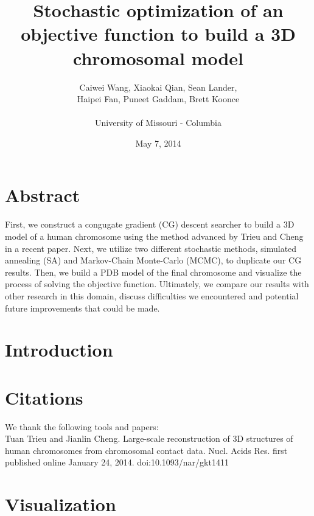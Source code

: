 \documentclass{article}
\title{Stochastic optimization of an objective function to build a 3D chromosomal model}
\author{Caiwei Wang, Xiaokai Qian, Sean Lander, \\Haipei Fan, Puneet Gaddam, Brett Koonce\\\\University of Missouri - Columbia}
\date{May 7, 2014}
\begin{document}
\maketitle

\section{Abstract}

First, we construct a congugate gradient (CG) descent searcher to build a 3D model of a human chromosome using the method advanced by Trieu and Cheng in a recent paper.  Next, we utilize two different stochastic methods, simulated annealing (SA) and Markov-Chain Monte-Carlo (MCMC), to duplicate our CG results.  Then, we build a PDB model of the final chromosome and visualize the process of solving the objective function.  Ultimately, we compare our results with other research in this domain, discuss difficulties we encountered and potential future improvements that could be made.

\section{Introduction}




\section{Citations}

We thank the following tools and papers: \\

Tuan Trieu and Jianlin Cheng.  Large-scale reconstruction of 3D structures of human chromosomes from chromosomal contact data.  Nucl. Acids Res. first published online January 24, 2014. doi:10.1093/nar/gkt1411


\section{Visualization}
\end{document}
